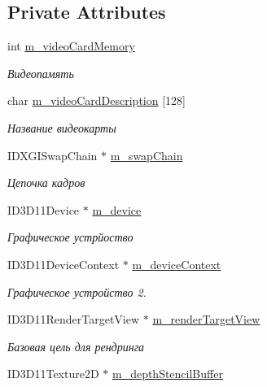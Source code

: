 \subsection*{Private Attributes}
\begin{DoxyCompactItemize}
\item 
int \hyperlink{class_d3_d_class_a6ece2de112350f95d607eff76fb1a79b}{m\+\_\+video\+Card\+Memory}
\begin{DoxyCompactList}\small\item\em Видеопамять \end{DoxyCompactList}\item 
char \hyperlink{class_d3_d_class_abfcb7ad8b62f0c141b6732c0361ebcbc}{m\+\_\+video\+Card\+Description} \mbox{[}128\mbox{]}
\begin{DoxyCompactList}\small\item\em Название видеокарты \end{DoxyCompactList}\item 
I\+D\+X\+G\+I\+Swap\+Chain $\ast$ \hyperlink{class_d3_d_class_af966a38e40cffc457c7303ae3108c296}{m\+\_\+swap\+Chain}
\begin{DoxyCompactList}\small\item\em Цепочка кадров \end{DoxyCompactList}\item 
I\+D3\+D11\+Device $\ast$ \hyperlink{class_d3_d_class_ad5051876b1b5befee32f1e1d511c040f}{m\+\_\+device}
\begin{DoxyCompactList}\small\item\em Графическое устрйоство \end{DoxyCompactList}\item 
I\+D3\+D11\+Device\+Context $\ast$ \hyperlink{class_d3_d_class_a46ae99eb05944cd1a838be2c1d054cb6}{m\+\_\+device\+Context}
\begin{DoxyCompactList}\small\item\em Графическое устройство 2. \end{DoxyCompactList}\item 
I\+D3\+D11\+Render\+Target\+View $\ast$ \hyperlink{class_d3_d_class_a59a5c37b00d653eeba493bb0752f266d}{m\+\_\+render\+Target\+View}
\begin{DoxyCompactList}\small\item\em Базовая цель для рендринга \end{DoxyCompactList}\item 
I\+D3\+D11\+Texture2D $\ast$ \hyperlink{class_d3_d_class_a610a04035fe760a5f232ecfa44f943ff}{m\+\_\+depth\+Stencil\+Buffer}

\end{DoxyCompactItemize}
